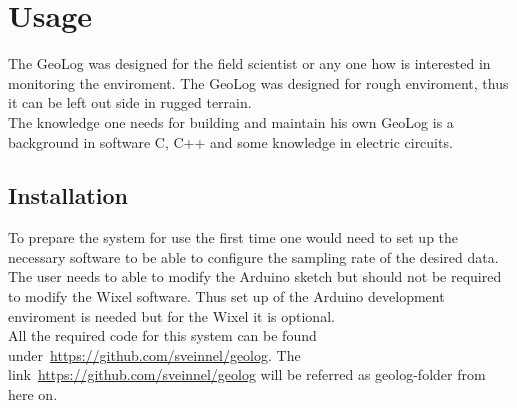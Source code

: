 \section{Usage}
The GeoLog was designed for the field scientist or any one how is interested in monitoring the enviroment. The GeoLog was designed for rough enviroment, thus it can be left out side in rugged terrain.\\
The knowledge one needs for building and maintain his own GeoLog is a background in software C, C++ and some knowledge in electric circuits. %

\subsection{Installation}
To prepare the system for use the first time one would need to set up the necessary software to be able to configure the sampling rate of the desired data. The user needs to able to modify the Arduino sketch but should not be required to modify the Wixel software. Thus set up of the Arduino development enviroment is needed but for the Wixel it is optional.\\
All the required code for this system can be found under~\url{https://github.com/sveinnel/geolog}. The link~\url{https://github.com/sveinnel/geolog} will be referred as geolog-folder from here on.\\

